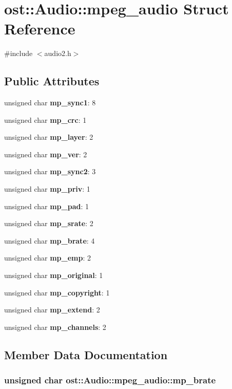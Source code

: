 \section{ost::Audio::mpeg\_\-audio Struct Reference}
\label{structost_1_1_audio_1_1mpeg__audio}


{\ttfamily \#include $<$audio2.h$>$}\subsection*{Public Attributes}
\begin{DoxyCompactItemize}
\item 
unsigned char {\bf mp\_\-sync1}: 8
\item 
unsigned char {\bf mp\_\-crc}: 1
\item 
unsigned char {\bf mp\_\-layer}: 2
\item 
unsigned char {\bf mp\_\-ver}: 2
\item 
unsigned char {\bf mp\_\-sync2}: 3
\item 
unsigned char {\bf mp\_\-priv}: 1
\item 
unsigned char {\bf mp\_\-pad}: 1
\item 
unsigned char {\bf mp\_\-srate}: 2
\item 
unsigned char {\bf mp\_\-brate}: 4
\item 
unsigned char {\bf mp\_\-emp}: 2
\item 
unsigned char {\bf mp\_\-original}: 1
\item 
unsigned char {\bf mp\_\-copyright}: 1
\item 
unsigned char {\bf mp\_\-extend}: 2
\item 
unsigned char {\bf mp\_\-channels}: 2
\end{DoxyCompactItemize}


\subsection{Member Data Documentation}
\subsubsection[{mp\_\-brate}]{\setlength{\rightskip}{0pt plus 5cm}unsigned char {\bf ost::Audio::mpeg\_\-audio::mp\_\-brate}}\label{structost_1_1_audio_1_1mpeg__audio_ab9679401bb55fbaa2121ab3f81d4a7ea}
